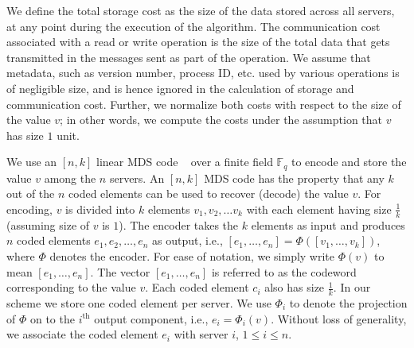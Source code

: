 We define the total storage cost as the size of the
data stored across all servers, at any point during the execution of the algorithm. The
communication cost associated with a read or write operation is the size of the total data that
gets transmitted in the messages sent as part of the operation. We assume that metadata,
such as version number, process ID, etc. used by various operations is of negligible size, and
is hence ignored in the calculation of storage and communication cost. Further, we normalize
both costs with respect to the size of the value $v$; in other words, we compute the costs
under the assumption that $v$ has size $1$ unit.

 We use an $[n, k]$  linear MDS code ~\cite{verapless_book} over a finite field $\mathbb{F}_q$ to encode and store the value $v$ among the $n$ servers. An $[n, k]$ MDS code has the property that any $k$ out of the $n$ coded elements can be used to recover (decode) the value $v$. For encoding, $v$ is divided
 into $k$ elements $v_1, v_2, \ldots v_k$ with each element having  size $\frac{1}{k}$ (assuming size of $v$ is $1$). The encoder takes the $k$ elements as input and produces $n$ coded elements $e_1, e_2, \ldots, e_n$ as output, i.e., $[e_1, \ldots, e_n] = \Phi([v_1, \ldots, v_k])$, where $\Phi$ denotes the encoder. For ease of notation, we simply write $\Phi(v)$ to mean  $[e_1, \ldots, e_n]$. The vector $[e_1, \ldots, e_n]$ is  referred to as the codeword corresponding to the value $v$. Each coded element $c_i$ also has  size $\frac{1}{k}$. In our scheme we store one coded element per server. We use $\Phi_i$ to denote the projection of $\Phi$ on to the $i^{\text{th}}$ output component, i.e., $e_i = \Phi_i(v)$. Without loss of generality, we associate the coded element $e_i$ with server $i$, $1 \leq i \leq n$.


